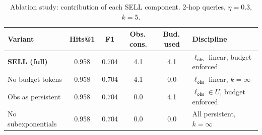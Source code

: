 \begin{table}[t]
\centering
\caption{Ablation study: contribution of each SELL component. 2-hop queries, $\eta=0.3$, $k=5$.}
\label{tab:ablation}
\small
\begin{tabular}{lccccl}
\toprule
Variant & Hits@1 & F1 & Obs.\,cons. & Bud.\,used & Discipline \\
\midrule
\textbf{SELL (full)} & 0.958 & 0.704 & 4.1 & 4.1 & $\ell_{\mathsf{obs}}$ linear, budget enforced \\
No budget tokens & 0.958 & 0.704 & 4.1 & 0.0 & $\ell_{\mathsf{obs}}$ linear, $k{=}\infty$ \\
Obs as persistent & 0.958 & 0.704 & 0.0 & 4.1 & $\ell_{\mathsf{obs}} \in U$, budget enforced \\
No subexponentials & 0.958 & 0.704 & 0.0 & 0.0 & All persistent, $k{=}\infty$ \\
\bottomrule
\end{tabular}
\end{table}